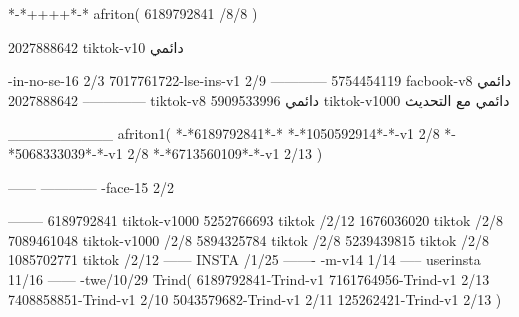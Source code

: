 *-*++++*-*
afriton(
6189792841 /8/8
)

2027888642 tiktok-v10
دائمي

-in-no-se-16 2/3
7017761722-lse-ins-v1 2/9
------------
5754454119 facbook-v8
دائمي
--------------
2027888642 tiktok-v8
دائمي
5909533996 tiktok-v1000
دائمي مع التحديث

__________
afriton1(
*-*6189792841*-*
*-*1050592914*-*-v1 2/8
*-*5068333039*-*-v1 2/8
*-*6713560109*-*-v1 2/13
)

------
------------
-face-15 2/2

--------
6189792841 tiktok-v1000
5252766693 tiktok /2/12
1676036020 tiktok /2/8
7089461048 tiktok-v1000 /2/8
5894325784 tiktok /2/8
5239439815 tiktok /2/8
1085702771 tiktok /2/12
------
 INSTA /1/25
-------
-m-v14 1/14
-----
userinsta 11/16
------
-twe/10/29
Trind(
6189792841-Trind-v1 
7161764956-Trind-v1 2/13
7408858851-Trind-v1 2/10
5043579682-Trind-v1 2/11
125262421-Trind-v1 2/13
)
